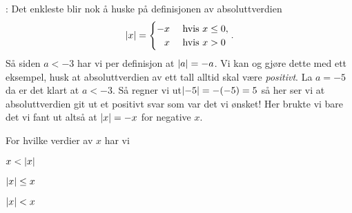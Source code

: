 \documentclass[a4paper,11pt]{article}
\begin{document}
\begin{solution}
  : Det enkleste blir nok å
  huske på definisjonen av absoluttverdien
  \begin{equation*}
    \label{eq:1-mix-14-MAT-0001-2019-V-def-absolute-value}
    \lvert x\rvert = 
    \begin{cases}
      -x & \ \text{hvis} \ x \leq 0, \\
      \phantom{-} x & \ \text{hvis} \ x > 0
    \end{cases}.
  \end{equation*}
  Så siden $a < -3$ har vi per definisjon at $\lvert a\rvert = -a$. Vi kan
  og gjøre dette med ett eksempel, husk at absoluttverdien av ett tall alltid
  skal være \emph{positivt}. La $a = -5$ da er det klart at $a < -3$. Så regner
  vi ut$\lvert-5\rvert = -(-5) = 5$ så her ser vi at absoluttverdien git ut et
  positivt svar som var det vi ønsket! Her brukte vi bare det vi fant ut altså
  at $\lvert x\rvert = -x$ for negative $x$.
\end{solution}


\begin{problem}
  For hvilke verdier av $x$ har vi
    \begin{subproblem}{3}
      \item $x < \lvert x\rvert$ 
        \label{subproblem:1-mix-16a-MAT-0001-2019-V}
      \item $\lvert x\rvert \leq x$ 
        \label{subproblem:1-mix-16b-MAT-0001-2019-V}
      \item $\lvert x\rvert < x$ \UiTcorrect{$\varnothing$}
        \label{subproblem:1-mix-16c-MAT-0001-2019-V}
    \end{subproblem}
\end{problem}
\end{document}

